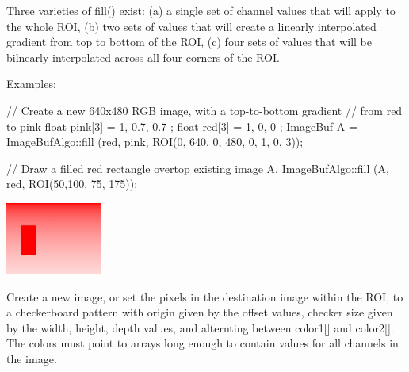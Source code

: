 Three varieties of fill() exist: (a) a single set of channel values that
will apply to the whole ROI, (b) two sets of values that will create a
linearly interpolated gradient from top to bottom of the ROI, (c) four
sets of values that will be bilnearly interpolated across all four
corners of the ROI.

\smallskip
\noindent Examples:
\begin{code}
    // Create a new 640x480 RGB image, with a top-to-bottom gradient
    // from red to pink
    float pink[3] = { 1, 0.7, 0.7 };
    float red[3] = { 1, 0, 0 };
    ImageBuf A = ImageBufAlgo::fill (red, pink, ROI(0, 640, 0, 480, 0, 1, 0, 3));

    // Draw a filled red rectangle overtop existing image A.
    ImageBufAlgo::fill (A, red, ROI(50,100, 75, 175));
\end{code}
\spc \includegraphics[width=1.25in]{figures/fill.jpg}  \\
\apiend


 
Create a new image, or set the pixels in the destination image within the
ROI, to a checkerboard pattern with origin given by the {\cf offset} values,
checker size given by the {\cf width, height, depth} values, and  alternting
between {\cf color1[]} and {\cf color2[]}.  The colors must point to arrays
long enough to contain values for all channels in the image.

